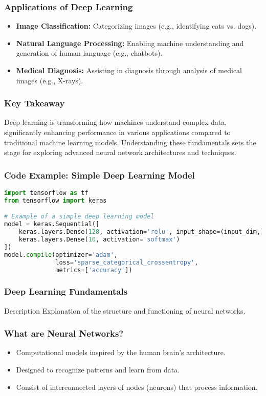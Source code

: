 \documentclass{beamer}
\begin{document}
\begin{frame}[fragile]
    \frametitle{Applications of Deep Learning}
    \begin{itemize}
        \item \textbf{Image Classification:} Categorizing images (e.g., identifying cats vs. dogs).
        \item \textbf{Natural Language Processing:} Enabling machine understanding and generation of human language (e.g., chatbots).
        \item \textbf{Medical Diagnosis:} Assisting in diagnosis through analysis of medical images (e.g., X-rays).
    \end{itemize}
\end{frame}

\begin{frame}[fragile]
    \frametitle{Key Takeaway}
    Deep learning is transforming how machines understand complex data, significantly enhancing performance in various applications compared to traditional machine learning models. Understanding these fundamentals sets the stage for exploring advanced neural network architectures and techniques.
\end{frame}

\begin{frame}[fragile]
    \frametitle{Code Example: Simple Deep Learning Model}
    \begin{lstlisting}[language=Python]
import tensorflow as tf
from tensorflow import keras

# Example of a simple deep learning model
model = keras.Sequential([
    keras.layers.Dense(128, activation='relu', input_shape=(input_dim,)),
    keras.layers.Dense(10, activation='softmax')
])
model.compile(optimizer='adam',
              loss='sparse_categorical_crossentropy',
              metrics=['accuracy'])
    \end{lstlisting}
\end{frame}

\begin{frame}[fragile]
    \frametitle{Deep Learning Fundamentals}
    \begin{block}{Description}
        Explanation of the structure and functioning of neural networks.
    \end{block}
\end{frame}

\begin{frame}[fragile]
    \frametitle{What are Neural Networks?}
    \begin{itemize}
        \item Computational models inspired by the human brain's architecture.
        \item Designed to recognize patterns and learn from data.
        \item Consist of interconnected layers of nodes (neurons) that process information.
    \end{itemize}
\end{frame}
\end{document}
